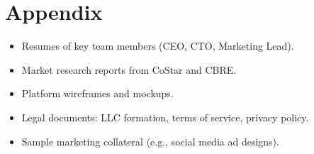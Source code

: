 \documentclass[12pt]{article}
\begin{document}
\section{Appendix}
\begin{itemize}
    \item Resumes of key team members (CEO, CTO, Marketing Lead).
    \item Market research reports from CoStar and CBRE.
    \item Platform wireframes and mockups.
    \item Legal documents: LLC formation, terms of service, privacy policy.
    \item Sample marketing collateral (e.g., social media ad designs).
\end{itemize}
\end{document}
